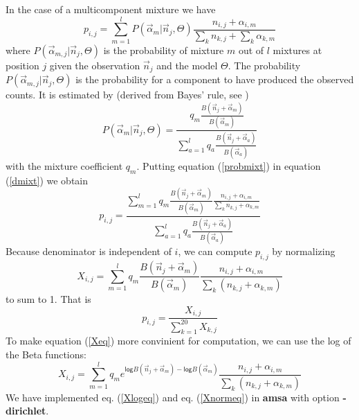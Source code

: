 \documentclass[a4paper,10pt,twoside]{scrartcl}
\begin{document}
\noindent In the case of a multicomponent mixture we have
\begin{equation}
p_{i,j} = \sum_{m=1}^{l}P(\overrightarrow{\alpha}_m | \overrightarrow{n}_j,\Theta)\frac{n_{i,j}+\alpha_{i,m}}{\sum_k n_{k,j} + \sum_k \alpha_{k,m}}
\label{dmixt}
\end{equation}
where $P(\overrightarrow{\alpha}_{m,j} | \overrightarrow{n}_j,\Theta)$ is the probability of mixture $m$ out of $l$ mixtures at position
$j$ given the observation $\overrightarrow{n}_j$ and the model $\Theta$.
The probability $P(\overrightarrow{\alpha}_{m,j} | \overrightarrow{n}_j,\Theta)$ is the probability for a component to have produced the observed counts.
It is estimated by (derived from Bayes' rule, see \cite{Sjolander96})
\begin{equation}
P(\overrightarrow{\alpha}_m | \overrightarrow{n}_j,\Theta) = 
\frac{ q_m
  \frac{B(\overrightarrow{n}_j+\overrightarrow{\alpha}_m)} {B(\overrightarrow{\alpha}_m)}
}{ 
  \sum_{a=1}^l q_a
  \frac{B(\overrightarrow{n}_j+\overrightarrow{\alpha}_a)} {B(\overrightarrow{\alpha}_a)} 
}
\label{probmixt}
\end{equation}
with the mixture coefficient $q_m$. 
Putting equation (\ref{probmixt}) in equation (\ref{dmixt}) we obtain
\begin{equation}
p_{i,j} = 
\frac{
  \sum_{m=1}^l q_m 
  \frac{
    B(\overrightarrow{n}_j + \overrightarrow{\alpha}_m)
  }
  {
    B(\overrightarrow{\alpha}_m)
  }
  \frac{
    n_{i,j} + \alpha_{i,m}
  }
  {
    \sum_k n_{k,j} + \alpha_{k,m}
  }
}
{
  \sum_{a=1}^l q_a
  \frac{
    B(\overrightarrow{n}_j + \overrightarrow{\alpha}_a)
  }
  {
    B(\overrightarrow{\alpha}_a)
  }
}
\end{equation}
Because denominator is independent of $i$, we can compute $p_{i,j}$ by normalizing
\begin{equation}
X_{i,j} = 
  \sum_{m=1}^l q_m 
  \frac{
    B(\overrightarrow{n}_j + \overrightarrow{\alpha}_m)
  }
  {
    B(\overrightarrow{\alpha}_m)
  }
  \frac{
    n_{i,j} + \alpha_{i,m}
  }
  {
    \sum_k (n_{k,j} + \alpha_{k,m})
  }
\label{Xeq}
\end{equation}
to sum to 1. That is
\begin{equation}
p_{i,j} = \frac{X_{i,j}}{\sum_{k=1}^{20} X_{k,j}}
\label{Xnormeq}
\end{equation}
To make equation (\ref{Xeq}) more convinient for computation, we can use the log of the Beta functions:
\begin{equation}
X_{i,j} = \sum_{m=1}^l q_m e^{\mathsf{log }B(\overrightarrow{n}_j + \overrightarrow{\alpha}_m) - \mathsf{log }B(\overrightarrow{\alpha}_m)} 
  \frac{
    n_{i,j} + \alpha_{i,m}
  }
  {
    \sum_k (n_{k,j} + \alpha_{k,m})
  }
\label{Xlogeq}
\end{equation}
We have implemented eq. (\ref{Xlogeq}) and eq. (\ref{Xnormeq}) in {\bf amsa} with option {\bf -dirichlet}.
\end{document}
